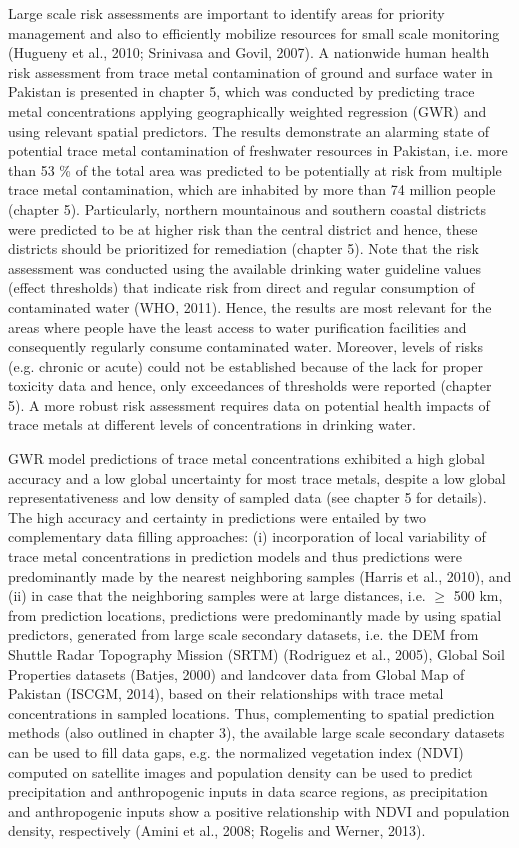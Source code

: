 Large scale risk assessments are important to identify areas for priority management and also to efficiently mobilize resources for small scale monitoring (Hugueny et al., 2010; Srinivasa and Govil, 2007). A nationwide human health risk assessment from trace metal contamination of ground and surface water in Pakistan is presented in chapter 5, which was conducted by predicting trace metal concentrations applying geographically weighted regression (GWR) and using relevant spatial predictors. The results demonstrate an alarming state of potential trace metal contamination of freshwater resources in Pakistan, i.e. more than 53 \% of the total area was predicted to be potentially at risk from multiple trace metal contamination, which are inhabited by more than 74 million people (chapter 5). Particularly, northern mountainous and southern coastal districts were predicted to be at higher risk than the central district and hence, these districts should be prioritized for remediation (chapter 5). Note that the risk assessment was conducted using the available drinking water guideline values (effect thresholds) that indicate risk from direct and regular consumption of contaminated water (WHO, 2011). Hence, the results are most relevant for the areas where people have the least access to water purification facilities and consequently regularly consume contaminated water. Moreover, levels of risks (e.g. chronic or acute) could not be established because of the lack for proper toxicity data and hence, only exceedances of thresholds were reported (chapter 5). A more robust risk assessment requires data on potential health impacts of trace metals at different levels of concentrations in drinking water.

GWR model predictions of trace metal concentrations exhibited a high global accuracy and a low global uncertainty for most trace metals, despite a low global representativeness and low density of sampled data (see chapter 5 for details). The high accuracy and certainty in predictions were entailed by two complementary data filling approaches: (i) incorporation of local variability of trace metal concentrations in prediction models and thus predictions were predominantly made by the nearest neighboring samples (Harris et al., 2010), and (ii) in case that the neighboring samples were at large distances, i.e. $\geq$ 500 km, from prediction locations, predictions were predominantly made by using spatial predictors, generated from large scale secondary datasets, i.e. the DEM from Shuttle Radar Topography Mission (SRTM) (Rodriguez et al., 2005), Global Soil Properties datasets (Batjes, 2000) and landcover data from Global Map of Pakistan (ISCGM, 2014), based on their relationships with trace metal concentrations in sampled locations. Thus, complementing to spatial prediction methods (also outlined in chapter 3), the available large scale secondary datasets can be used to fill data gaps, e.g. the normalized vegetation index (NDVI) computed on satellite images and population density can be used to predict precipitation and anthropogenic inputs in data scarce regions, as precipitation and anthropogenic inputs show a positive relationship with NDVI and population density, respectively (Amini et al., 2008; Rogelis and Werner, 2013).

